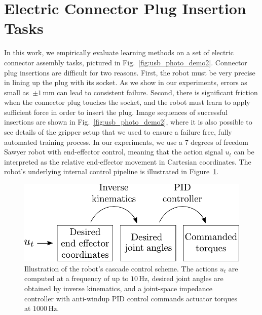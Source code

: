 \section{Electric Connector Plug Insertion Tasks}

In this work, we empirically evaluate learning methods on a set of electric connector assembly tasks, pictured in Fig.~\ref{fig:usb_photo_demo2}.
Connector plug insertions are difficult for two reasons. 
First, the robot must be very precise in lining up the plug with its socket. 
As we show in our experiments, errors as small as~$\pm 1$\,mm can lead to consistent failure. 
Second, there is significant friction when the connector plug touches the socket, and the robot must learn to apply sufficient force in order to insert the plug. Image sequences of successful insertions are shown in Fig.~\ref{fig:usb_photo_demo2}, where it is also possible to see details of the gripper setup that we used to ensure a failure free, fully automated training process.
In our experiments, we use a 7 degrees of freedom Sawyer robot with end-effector control, meaning that the action signal $u_t$ can be interpreted as the relative end-effector movement in Cartesian coordinates. The robot's underlying internal control pipeline is illustrated in Figure~\ref{fig:control_pipeline}.

\begin{figure}
  \begin{center}
        \includegraphics[width=0.88\linewidth]{insertion/newfigs/control_pipeline.pdf}
    \caption{Illustration of the robot's cascade control scheme. The actions  $u_t$ are computed at a frequency of up to $10\,\mathrm{Hz}$,  desired joint angles are obtained by inverse kinematics, and a joint-space impedance controller with anti-windup PID control commands actuator torques at $1000\,\mathrm{Hz}$.}
   \label{fig:control_pipeline}
  \end{center}
\end{figure}

